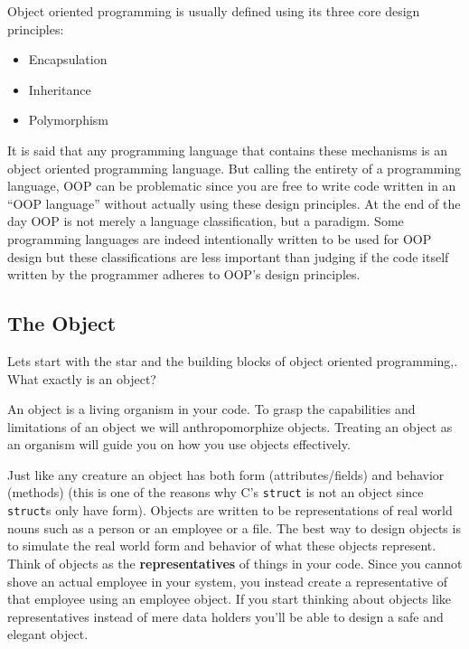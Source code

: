 Object oriented programming is usually defined using its three core
design principles:

\begin{itemize}
\tightlist
\item
  Encapsulation
\item
  Inheritance
\item
  Polymorphism
\end{itemize}

It is said that any programming language that contains these mechanisms
is an object oriented programming language. But calling the entirety of
a programming language, OOP can be problematic since you are free to
write code written in an ``OOP language'' without actually using these
design principles. At the end of the day OOP is not merely a language
classification, but a paradigm. Some programming languages are indeed
intentionally written to be used for OOP design but these
classifications are less important than judging if the code itself
written by the programmer adheres to OOP's design principles.

\subsection{The
Object}\label{object-oriented-programming-paradigm.md__the-object}

Lets start with the star and the building blocks of object oriented
programming,. What exactly is an object?

An object is a living organism in your code. To grasp the capabilities
and limitations of an object we will anthropomorphize objects. Treating
an object as an organism will guide you on how you use objects
effectively.

Just like any creature an object has both form (attributes/fields) and
behavior (methods) (this is one of the reasons why C's \texttt{struct}
is not an object since \texttt{struct}s only have form). Objects are
written to be representations of real world nouns such as a person or an
employee or a file. The best way to design objects is to simulate the
real world form and behavior of what these objects represent. Think of
objects as the \textbf{representatives} of things in your code. Since
you cannot shove an actual employee in your system, you instead create a
representative of that employee using an employee object. If you start
thinking about objects like representatives instead of mere data holders
you'll be able to design a safe and elegant object.


